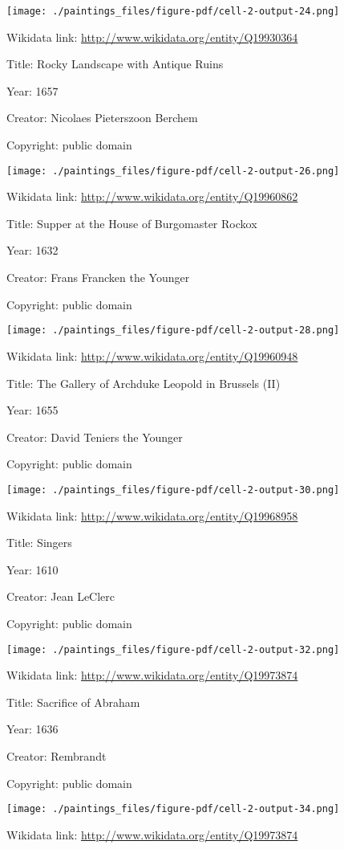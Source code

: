 \documentclass[
  letterpaper,
]{book}
\begin{document}
\texttt{[image: ./paintings\_files/figure-pdf/cell-2-output-24.png]}

Wikidata link: \url{http://www.wikidata.org/entity/Q19930364}

Title: Rocky Landscape with Antique Ruins

Year: 1657

Creator: Nicolaes Pieterszoon Berchem

Copyright: public domain

\texttt{[image: ./paintings\_files/figure-pdf/cell-2-output-26.png]}

Wikidata link: \url{http://www.wikidata.org/entity/Q19960862}

Title: Supper at the House of Burgomaster Rockox

Year: 1632

Creator: Frans Francken the Younger

Copyright: public domain

\texttt{[image: ./paintings\_files/figure-pdf/cell-2-output-28.png]}

Wikidata link: \url{http://www.wikidata.org/entity/Q19960948}

Title: The Gallery of Archduke Leopold in Brussels (II)

Year: 1655

Creator: David Teniers the Younger

Copyright: public domain

\texttt{[image: ./paintings\_files/figure-pdf/cell-2-output-30.png]}

Wikidata link: \url{http://www.wikidata.org/entity/Q19968958}

Title: Singers

Year: 1610

Creator: Jean LeClerc

Copyright: public domain

\texttt{[image: ./paintings\_files/figure-pdf/cell-2-output-32.png]}

Wikidata link: \url{http://www.wikidata.org/entity/Q19973874}

Title: Sacrifice of Abraham

Year: 1636

Creator: Rembrandt

Copyright: public domain

\texttt{[image: ./paintings\_files/figure-pdf/cell-2-output-34.png]}

Wikidata link: \url{http://www.wikidata.org/entity/Q19973874}
\end{document}
